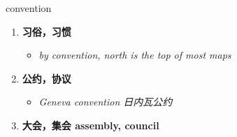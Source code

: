 
\begin{frame}
{\huge convention}
\begin{center}
\begin{enumerate}\Large
  \item \textbf{习俗，习惯}
  \begin{itemize}
    \item \em{\Large{by convention, north is the top of most maps}}
  \end{itemize}
  \item \textbf{公约，协议}
  \begin{itemize}
    \item \em{\Large{Geneva convention 日内瓦公约}}
  \end{itemize}
  \item \textbf{大会，集会 assembly, council}
\end{enumerate}
\end{center}
\end{frame}
